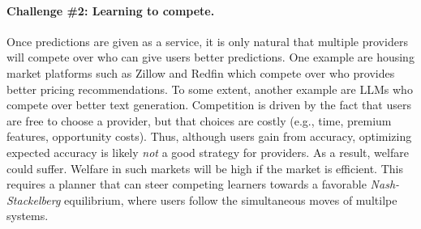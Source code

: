  

\paragraph{Challenge \#2: Learning to compete.} 
Once predictions are given as a service,
it is only  natural that multiple providers will compete over who
can give users better predictions.
One example are housing market platforms such as Zillow and Redfin which compete over who
provides better pricing recommendations. %
To some extent, another example are LLMs who compete over better text generation.
Competition is driven by the fact that users are free to choose a provider,
but that choices are costly (e.g., time, premium features, opportunity costs).
Thus, although users gain from accuracy,
optimizing expected accuracy is likely \emph{not} a good strategy for providers.
As a result, welfare could suffer.
Welfare in such markets will be high if the market is efficient.
This requires a planner that can steer competing 
learners towards a favorable \emph{Nash-Stackelberg} equilibrium,
where users follow the simultaneous moves of multilpe systems. 





